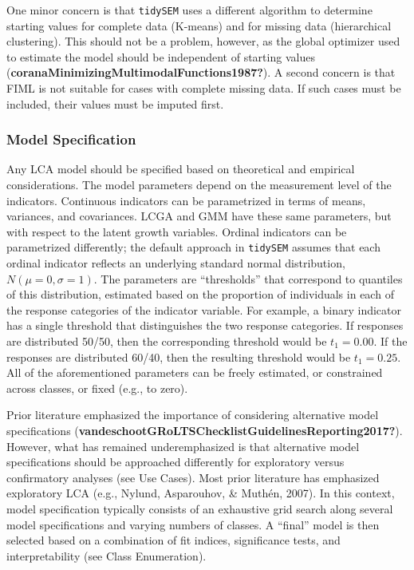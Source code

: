 \documentclass[
  ,man,floatsintext]{apa6}
\begin{document}
One minor concern is that \texttt{tidySEM} uses a different algorithm to determine starting values for complete data (K-means) and for missing data (hierarchical clustering).
This should not be a problem, however, as the global optimizer used to estimate the model should be independent of starting values (\textbf{coranaMinimizingMultimodalFunctions1987?}).
A second concern is that FIML is not suitable for cases with complete missing data.
If such cases must be included, their values must be imputed first.

\hypertarget{model-specification}{%
\subsubsection{Model Specification}\label{model-specification}}

Any LCA model should be specified based on theoretical and empirical considerations.
The model parameters depend on the measurement level of the indicators.
Continuous indicators can be parametrized in terms of means, variances, and covariances.
LCGA and GMM have these same parameters,
but with respect to the latent growth variables.
Ordinal indicators can be parametrized differently;
the default approach in \texttt{tidySEM} assumes that each ordinal indicator reflects an underlying standard normal distribution, \(N(\mu = 0, \sigma = 1)\).
The parameters are ``thresholds'' that correspond to quantiles of this distribution, estimated based on the proportion of individuals in each of the
response categories of the indicator variable.
For example, a binary
indicator has a single threshold that distinguishes the two response
categories. If responses are distributed 50/50, then the corresponding
threshold would be \(t_1 = 0.00\). If the responses are distributed 60/40,
then the resulting threshold would be \(t_1 = 0.25\).
All of the aforementioned parameters can be freely estimated,
or constrained across classes, or fixed (e.g., to zero).

Prior literature emphasized the importance of considering alternative model specifications (\textbf{vandeschootGRoLTSChecklistGuidelinesReporting2017?}).
However, what has remained underemphasized is that alternative model specifications should be approached differently for exploratory versus confirmatory analyses (see Use Cases).
Most prior literature has emphasized exploratory LCA (e.g., Nylund, Asparouhov, \& Muthén, 2007).
In this context, model specification typically consists of an exhaustive grid search along several model specifications and varying numbers of classes.
A ``final'' model is then selected based on a combination of fit indices,
significance tests,
and interpretability (see Class Enumeration).
\end{document}
